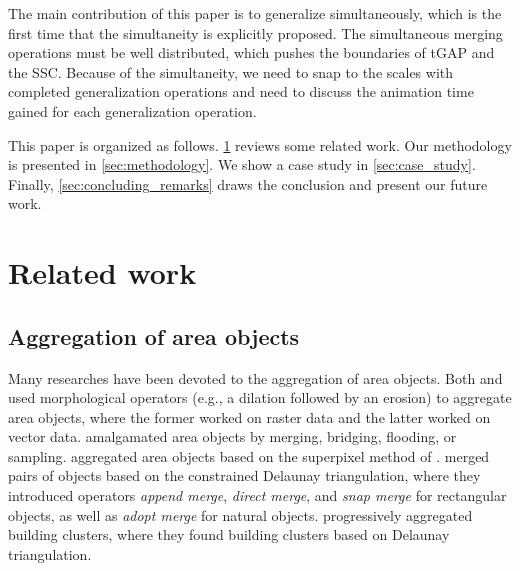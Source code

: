 \documentclass[twocolumn]{svjour3}          %
\begin{document}
The main contribution of this paper is 
to generalize simultaneously,
which is the first time that the simultaneity 
is explicitly proposed.
The simultaneous merging operations must be well distributed,
which pushes the boundaries of tGAP and the SSC.
Because of the simultaneity, 
we need to snap to the scales with completed generalization operations
and need to discuss the animation time gained for each generalization operation.


This paper is organized as follows.
\sect\ref{sec:realted_work} reviews some related work.
Our methodology is presented in \sect\ref{sec:methodology}.
We show a case study in \sect\ref{sec:case_study}.
Finally, \sect\ref{sec:concluding_remarks} draws the conclusion
and present our future work.



\section{Related work}
\label{sec:realted_work}





\subsection{Aggregation of area objects}
Many researches have been devoted to the aggregation of area objects.
Both \citet{Su1997aggregation} and \citet{Sester2005Optimization} 
used morphological operators (e.g., a dilation followed by an erosion)
to aggregate area objects, 
where the former worked on raster data and the latter worked on vector data.
\citet{Regnauld2003Amalgamation} 
amalgamated area objects
by merging, bridging, flooding, or sampling. 
\citet{Shen2019Aggregation} aggregated area objects
based on the superpixel method of \citet{Achanta2012SLIC}.
\citet{Ware1995Areal} merged pairs of objects 
based on the constrained Delaunay triangulation,
where they introduced operators 
\emph{append merge}, \emph{direct merge}, and \emph{snap merge}
for rectangular objects, as well as \emph{adopt merge} for natural objects. 
\citet{Ai2007Aggregation} progressively aggregated building clusters,
where they found building clusters based on Delaunay triangulation.
\end{document}
